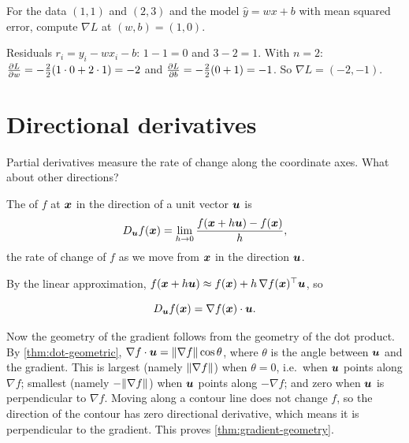 \begin{exercise}
For the data $(1, 1)$ and $(2, 3)$ and the model $\hat y = wx + b$ with mean
squared error, compute $\nabla L$ at $(w, b) = (1, 0)$.
\end{exercise}
\begin{solution}
Residuals $r_i = y_i - wx_i - b$: $1 - 1 = 0$ and $3 - 2 = 1$. With $n = 2$:
$\frac{\partial L}{\partial w} = -\tfrac22(1\cdot0 + 2\cdot1) = -2$ and
$\frac{\partial L}{\partial b} = -\tfrac22(0 + 1) = -1$. So $\nabla L = (-2, -1)$.
\end{solution}

\section{Directional derivatives}\label{sec:directional-derivatives}

Partial derivatives measure the rate of change along the coordinate axes. What
about other directions?

\begin{definition}\label{def:directional-derivative}
The  of $f$ at $\bm{x}$ in the direction of a unit
vector $\bm{u}$ is
\[
  D_{\bm{u}}f(\bm{x}) = \lim_{h\to0}\frac{f(\bm{x} + h\bm{u}) - f(\bm{x})}{h},
\]
the rate of change of $f$ as we move from $\bm{x}$ in the direction $\bm{u}$.
\end{definition}

By the linear approximation, $f(\bm{x} + h\bm{u}) \approx f(\bm{x}) + h\,\nabla
f(\bm{x})^\top\bm{u}$, so

\begin{theorem}\label{thm:directional}
\[
  D_{\bm{u}}f(\bm{x}) = \nabla f(\bm{x})\cdot\bm{u} .
\]
\end{theorem}

Now the geometry of the gradient follows from the geometry of the dot product.
By \cref{thm:dot-geometric}, $\nabla f\cdot\bm{u} = \lVert\nabla f\rVert\cos\theta$, where
$\theta$ is the angle between $\bm{u}$ and the gradient. This is largest
(namely $\lVert\nabla f\rVert$) when $\theta = 0$, i.e.\ when $\bm{u}$ points along
$\nabla f$; smallest (namely $-\lVert\nabla f\rVert$) when $\bm{u}$ points along
$-\nabla f$; and zero when $\bm{u}$ is perpendicular to $\nabla f$. Moving along a
contour line does not change $f$, so the direction of the contour has zero
directional derivative, which means it is perpendicular to the gradient. This
proves \cref{thm:gradient-geometry}.

